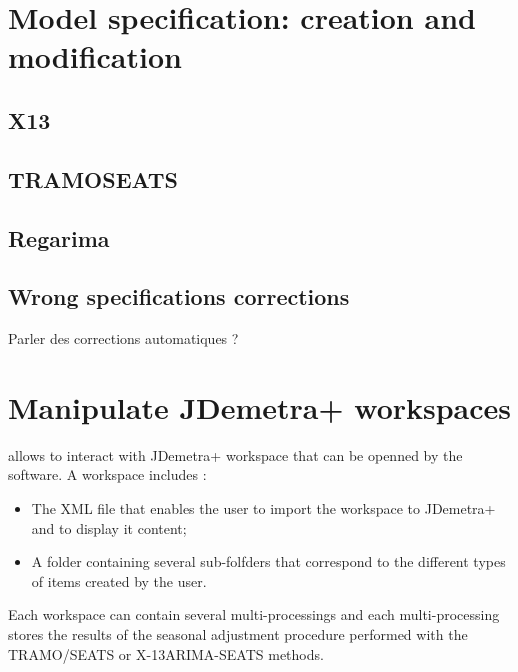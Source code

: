 \documentclass[article]{jss}
\providecommand{\tightlist}{%
  \setlength{\itemsep}{0pt}\setlength{\parskip}{0pt}}
\begin{document}
\hypertarget{model-specification-creation-and-modification}{%
\section{Model specification: creation and
modification}\label{model-specification-creation-and-modification}}

\hypertarget{x13}{%
\subsection{X13}\label{x13}}

\hypertarget{tramoseats}{%
\subsection{TRAMOSEATS}\label{tramoseats}}

\hypertarget{regarima-1}{%
\subsection{Regarima}\label{regarima-1}}

\hypertarget{wrong-specifications-corrections}{%
\subsection{Wrong specifications
corrections}\label{wrong-specifications-corrections}}

Parler des corrections automatiques ?

\hypertarget{manipulate-jdemetra-workspaces}{%
\section{Manipulate JDemetra+
workspaces}\label{manipulate-jdemetra-workspaces}}

 allows to interact with JDemetra+ workspace that can be
openned by the software. A workspace includes :

\begin{itemize}
\tightlist
\item
  The XML file that enables the user to import the workspace to
  JDemetra+ and to display it content;\\
\item
  A folder containing several sub-folfders that correspond to the
  different types of items created by the user.
\end{itemize}

Each workspace can contain several multi-processings and each
multi-processing stores the results of the seasonal adjustment procedure
performed with the TRAMO/SEATS or X-13ARIMA-SEATS methods.
\end{document}
